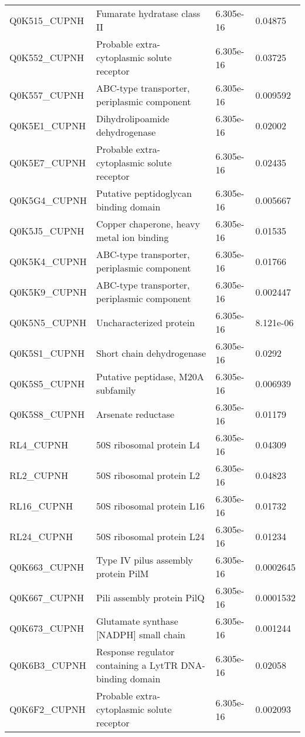 \begin{center}
\begin{longtable}{ l l l l }
Q0K515\_CUPNH & Fumarate hydratase class II& 6.305e-16 & 0.04875 \\ [0.5ex]
Q0K552\_CUPNH & Probable extra-cytoplasmic solute receptor& 6.305e-16 & 0.03725 \\ [0.5ex]
Q0K557\_CUPNH & ABC-type transporter, periplasmic component& 6.305e-16 & 0.009592 \\ [0.5ex]
Q0K5E1\_CUPNH & Dihydrolipoamide dehydrogenase& 6.305e-16 & 0.02002 \\ [0.5ex]
Q0K5E7\_CUPNH & Probable extra-cytoplasmic solute receptor & 6.305e-16 & 0.02435 \\ [0.5ex]
Q0K5G4\_CUPNH & Putative peptidoglycan binding domain& 6.305e-16 & 0.005667 \\ [0.5ex]
Q0K5J5\_CUPNH & Copper chaperone, heavy metal ion binding& 6.305e-16 & 0.01535 \\ [0.5ex]
Q0K5K4\_CUPNH & ABC-type transporter, periplasmic component& 6.305e-16 & 0.01766 \\ [0.5ex]
Q0K5K9\_CUPNH & ABC-type transporter, periplasmic component& 6.305e-16 & 0.002447 \\ [0.5ex]
Q0K5N5\_CUPNH & Uncharacterized protein& 6.305e-16 & 8.121e-06 \\ [0.5ex]
Q0K5S1\_CUPNH & Short chain dehydrogenase& 6.305e-16 & 0.0292 \\ [0.5ex]
Q0K5S5\_CUPNH & Putative peptidase, M20A subfamily& 6.305e-16 & 0.006939 \\ [0.5ex]
Q0K5S8\_CUPNH & Arsenate reductase& 6.305e-16 & 0.01179 \\ [0.5ex]
RL4\_CUPNH & 50S ribosomal protein L4& 6.305e-16 & 0.04309 \\ [0.5ex]
RL2\_CUPNH & 50S ribosomal protein L2& 6.305e-16 & 0.04823 \\ [0.5ex]
RL16\_CUPNH & 50S ribosomal protein L16& 6.305e-16 & 0.01732 \\ [0.5ex]
RL24\_CUPNH & 50S ribosomal protein L24& 6.305e-16 & 0.01234 \\ [0.5ex]
Q0K663\_CUPNH & Type IV pilus assembly protein PilM& 6.305e-16 & 0.0002645 \\ [0.5ex]
Q0K667\_CUPNH & Pili assembly protein PilQ& 6.305e-16 & 0.0001532 \\ [0.5ex]
Q0K673\_CUPNH & Glutamate synthase [NADPH] small chain& 6.305e-16 & 0.001244 \\ [0.5ex]
Q0K6B3\_CUPNH & Response regulator containing a LytTR DNA-binding domain& 6.305e-16 & 0.02058 \\ [0.5ex]
Q0K6F2\_CUPNH & Probable extra-cytoplasmic solute receptor& 6.305e-16 & 0.002093 \\ [0.5ex]

\end{longtable}
\end{center}
